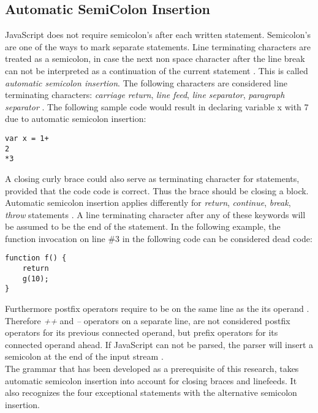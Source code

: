 \documentclass[journal,10pt]{IEEEtran} %
\begin{document}
\subsection{Automatic SemiColon Insertion}
JavaScript does not require semicolon's after each written statement. Semicolon's are one of the ways to mark separate statements. Line terminating characters are treated as a semicolon, in case the next non space character after the line break can not be interpreted as a continuation of the current statement \cite[p. 25]{flanagan2011javascript}. This is called \textit{automatic semicolon insertion}. The following characters are considered line terminating characters: \textit{carriage return}, \textit{line feed}, \textit{line separator}, \textit{paragraph separator} \cite[p. 15]{ecmascriptspecs}. The following sample code would result in declaring variable x with 7 due to automatic semicolon insertion:
\vskip 6pt
\begin{verbatim}
var x = 1+
2
*3
\end{verbatim}
\vskip 6pt
A closing curly brace could also serve as terminating character for statements, provided that the code code is correct. Thus the brace should be closing a block. \\
Automatic semicolon insertion applies differently for \textit{return}, \textit{continue}, \textit{break}, \textit{throw} statements \cite[p. 26]{flanagan2011javascript} \cite[p. 26]{ecmascriptspecs}. A line terminating character after any of these keywords will be assumed to be the end of the statement. In the following example, the function invocation on line \#3 in the following code can be considered dead code:
\vskip 6pt
\begin{verbatim}
function f() {
    return
    g(10);
}
\end{verbatim}
\vskip 6pt
Furthermore postfix operators require to be on the same line as the its operand \cite[p. 27]{ecmascriptspecs}. Therefore \textit{++} and \textit{--} operators on a separate line, are not considered postfix operators for its previous connected operand, but prefix operators for its connected operand ahead.
If JavaScript can not be parsed, the parser will insert a semicolon at the end of the input stream \cite[p. 27]{ecmascriptspecs}. \\
The grammar that has been developed as a prerequisite of this research, takes automatic semicolon insertion into account for closing braces and linefeeds. It also recognizes the four exceptional statements with the alternative semicolon insertion. %
\end{document}
